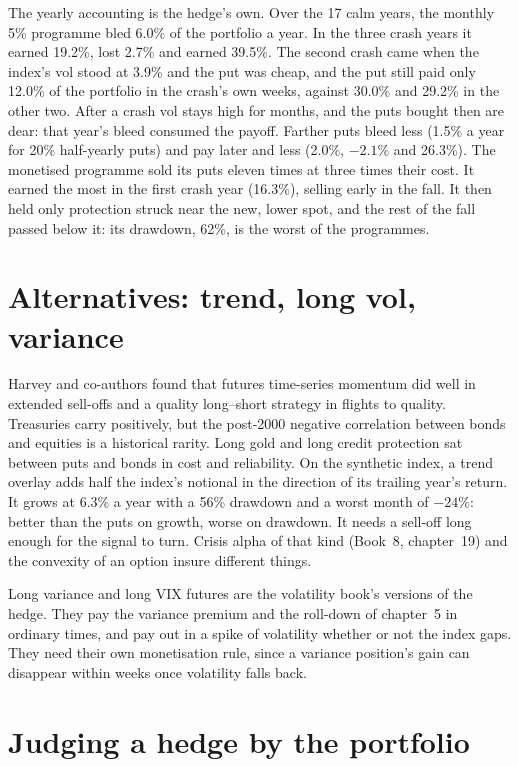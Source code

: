 The yearly accounting is the hedge's own. Over the 17 calm years, the monthly 5\% programme bled 6.0\% of the portfolio a year. In the three crash
years it earned 19.2\%, lost 2.7\% and earned 39.5\%. The second crash came when the index's vol stood at 3.9\% and the put was cheap, and the put
still paid only 12.0\% of the portfolio in the crash's own weeks, against 30.0\% and 29.2\% in the other two. After a crash vol stays high for months, and the puts bought then are dear: that year's bleed consumed the
payoff. Farther puts bleed less (1.5\% a year for 20\% half-yearly puts) and pay later and less (2.0\%, $-2.1\%$ and 26.3\%). The monetised programme
sold its puts eleven times at three times their cost. It earned the most in the first crash year (16.3\%), selling early in the fall. It then held only protection struck near
the new, lower spot, and the rest of the fall passed below it: its drawdown, 62\%, is the worst of the programmes.

\section{Alternatives: trend, long vol, variance}

Harvey and co-authors found that futures time-series momentum did well in extended sell-offs and a quality long--short strategy in flights to
quality. Treasuries carry positively, but the post-2000 negative correlation between bonds and equities is a historical rarity. Long gold and long
credit protection sat between puts and bonds in cost and reliability. On the synthetic index, a trend overlay adds half the index's notional in the
direction of its trailing year's return. It grows at 6.3\% a year with a 56\% drawdown and a worst month of $-24\%$: better than the puts on growth,
worse on drawdown. It needs a sell-off long enough for the signal to turn. Crisis alpha of that kind (Book~8, chapter~19) and the convexity of an
option insure different things.

Long variance and long VIX futures are the volatility book's versions of the hedge. They pay the variance premium and the roll-down of chapter~5 in
ordinary times, and pay out in a spike of volatility whether or not the index gaps. They need their own monetisation rule, since a variance position's
gain can disappear within weeks once volatility falls back.

\section{Judging a hedge by the portfolio}

